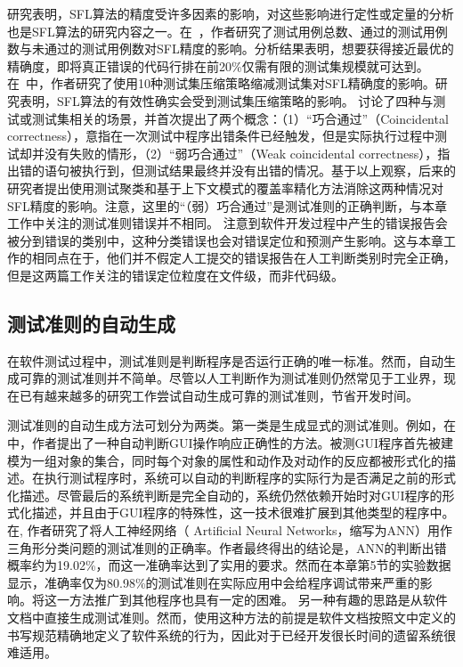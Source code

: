研究表明，SFL算法的精度受许多因素的影响，对这些影响进行定性或定量的分析也是SFL算法的研究内容之一。在~\cite{Abreu20091780}，作者研究了测试用例总数、通过的测试用例数与未通过的测试用例数对SFL精度的影响。分析结果表明，想要获得接近最优的精确度，即将真正错误的代码行排在前20\%仅需有限的测试集规模就可达到。在~\cite{Yu:2008:ESE:1368088.1368116}中，作者研究了使用10种测试集压缩策略缩减测试集对SFL精确度的影响。研究表明，SFL算法的有效性确实会受到测试集压缩策略的影响。
\cite{Masri:2009:ESF:1555860.1555862}讨论了四种与测试或测试集相关的场景，并首次提出了两个概念：（1）“巧合通过”（Coincidental correctness），意指在一次测试中程序出错条件已经触发，但是实际执行过程中测试却并没有失败的情形，（2）“弱巧合通过”（Weak coincidental correctness），指出错的语句被执行到，但测试结果最终并没有出错的情况。基于以上观察，后来的研究者提出使用测试聚类\cite{5477086}\cite{Masri:2014:PCC:2582050.2559932}和基于上下文模式的覆盖率精化方法\cite{Wang:2009:TCC:1555001.1555022}消除这两种情况对SFL精度的影响。注意，这里的“（弱）巧合通过”是测试准则的正确判断，与本章工作中关注的测试准则错误并不相同。
\cite{Kochhar:2014:BFM:2597073.2597105}\cite{Herzig:2013:IBI:2486788.2486840}注意到软件开发过程中产生的错误报告会被分到错误的类别中，这种分类错误也会对错误定位和预测产生影响。这与本章工作的相同点在于，他们并不假定人工提交的错误报告在人工判断类别时完全正确，但是这两篇工作关注的错误定位粒度在文件级，而非代码级。

\subsection{测试准则的自动生成}

在软件测试过程中，测试准则是判断程序是否运行正确的唯一标准。然而，自动生成可靠的测试准则并不简单。尽管以人工判断作为测试准则仍然常见于工业界，现在已有越来越多的研究工作尝试自动生成可靠的测试准则，节省开发时间。

测试准则的自动生成方法可划分为两类。第一类是生成显式的测试准则。例如，在\cite{Memon:2000:ATO:357474.355050}中，作者提出了一种自动判断GUI操作响应正确性的方法。被测GUI程序首先被建模为一组对象的集合，同时每个对象的属性和动作及对动作的反应都被形式化的描述。在执行测试程序时，系统可以自动的判断程序的实际行为是否满足之前的形式化描述。尽管最后的系统判断是完全自动的，系统仍然依赖开始时对GUI程序的形式化描述，并且由于GUI程序的特殊性，这一技术很难扩展到其他类型的程序中。
在\cite{Aggarwal:2004:NNB:986710.986725}, 作者研究了将人工神经网络（ Artificial Neural Networks，缩写为ANN）用作三角形分类问题的测试准则的正确率。作者最终得出的结论是，ANN的判断出错概率约为19.02\%，而这一准确率达到了实用的要求。然而在本章第5节的实验数据显示，准确率仅为80.98\%的测试准则在实际应用中会给程序调试带来严重的影响。将这一方法推广到其他程序也具有一定的困难。
另一种有趣的思路是从软件文档中直接生成测试准则\cite{667877-documentation}。然而，使用这种方法的前提是软件文档按照文中定义的书写规范精确地定义了软件系统的行为，因此对于已经开发很长时间的遗留系统很难适用。

